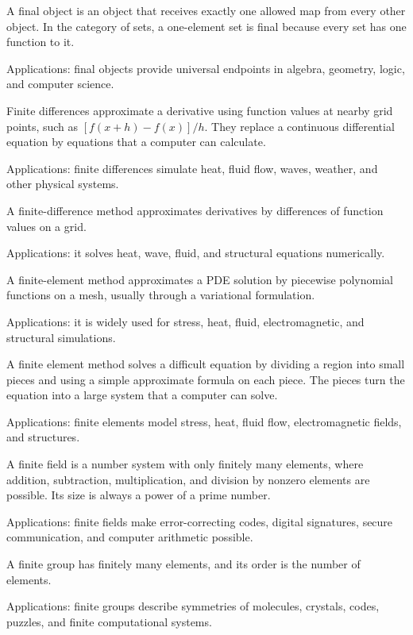 A final object is an object that receives exactly one allowed map from every other object. In the category of sets, a one-element set is final because every set has one function to it. \par\noindent Applications: final objects provide universal endpoints in algebra, geometry, logic, and computer science.

Finite differences approximate a derivative using function values at nearby grid points, such as $[f(x+h)-f(x)]/h$. They replace a continuous differential equation by equations that a computer can calculate. \par\noindent Applications: finite differences simulate heat, fluid flow, waves, weather, and other physical systems.

A finite-difference method approximates derivatives by differences of function values on a grid. \par\noindent Applications: it solves heat, wave, fluid, and structural equations numerically.

A finite-element method approximates a PDE solution by piecewise polynomial functions on a mesh, usually through a variational formulation. \par\noindent Applications: it is widely used for stress, heat, fluid, electromagnetic, and structural simulations.

A finite element method solves a difficult equation by dividing a region into small pieces and using a simple approximate formula on each piece. The pieces turn the equation into a large system that a computer can solve. \par\noindent Applications: finite elements model stress, heat, fluid flow, electromagnetic fields, and structures.

A finite field is a number system with only finitely many elements, where addition, subtraction, multiplication, and division by nonzero elements are possible. Its size is always a power of a prime number. \par\noindent Applications: finite fields make error-correcting codes, digital signatures, secure communication, and computer arithmetic possible.

A finite group has finitely many elements, and its order is the number of elements. \par\noindent Applications: finite groups describe symmetries of molecules, crystals, codes, puzzles, and finite computational systems.

